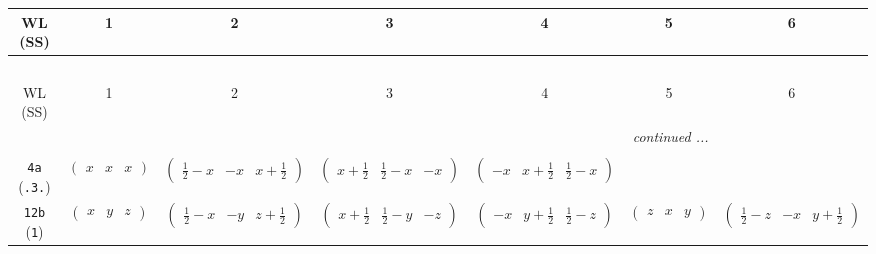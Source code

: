 \documentclass[fleqn,9pt,landscape]{jsarticle}
\begin{document}
\begin{center}
\renewcommand{\arraystretch}{1.2}
\begin{longtable}{ccccccc}
 \hline \hline
WL (SS) & 1 & 2 & 3 & 4 & 5 & 6 \\ \hline \endfirsthead

\multicolumn{6}{l}{\tablename\ \thetable{}} \\
 \hline \hline
WL (SS) & 1 & 2 & 3 & 4 & 5 & 6 \\ \hline \endhead

 \hline \hline
\multicolumn{6}{r}{\footnotesize\it continued ...} \\ \endfoot

 \hline \hline
\multicolumn{6}{r}{} \\ \endlastfoot

{\tt 4a} ({\tt .3.}) & $ \begin{pmatrix} x & x & x \end{pmatrix} $ & $ \begin{pmatrix} \frac{1}{2} - x & - x & x + \frac{1}{2} \end{pmatrix} $ & $ \begin{pmatrix} x + \frac{1}{2} & \frac{1}{2} - x & - x \end{pmatrix} $ & $ \begin{pmatrix} - x & x + \frac{1}{2} & \frac{1}{2} - x \end{pmatrix} $ & $  $ & $  $ \\ \hline
{\tt 12b} ({\tt 1}) & $ \begin{pmatrix} x & y & z \end{pmatrix} $ & $ \begin{pmatrix} \frac{1}{2} - x & - y & z + \frac{1}{2} \end{pmatrix} $ & $ \begin{pmatrix} x + \frac{1}{2} & \frac{1}{2} - y & - z \end{pmatrix} $ & $ \begin{pmatrix} - x & y + \frac{1}{2} & \frac{1}{2} - z \end{pmatrix} $ & $ \begin{pmatrix} z & x & y \end{pmatrix} $ & $ \begin{pmatrix} \frac{1}{2} - z & - x & y + \frac{1}{2} \end{pmatrix} $ \\

\end{longtable}
\end{center}
\end{document}
